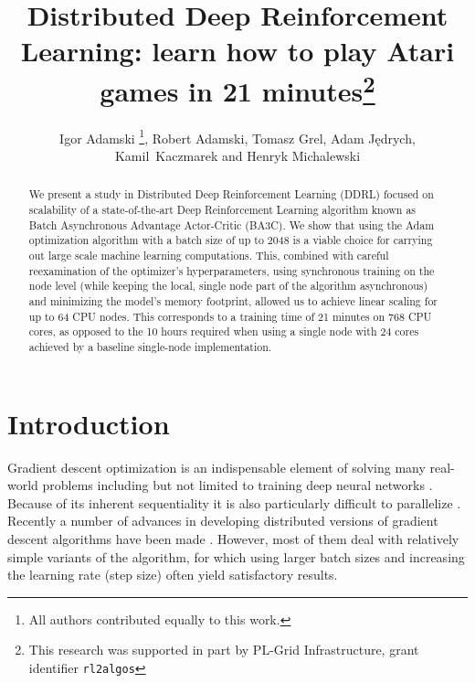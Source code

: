 \documentclass{llncs}
\begin{document}
\frontmatter
\pagestyle{headings}
\mainmatter  

	
\title{Distributed Deep Reinforcement Learning: learn how to play Atari games in 21 minutes\thanks{This research was supported in part by PL-Grid Infrastructure, grant identifier \texttt{rl2algos}}}
\author{Igor Adamski \thanks{All authors contributed equally to this work.}, Robert Adamski, Tomasz Grel, Adam Jędrych, \mbox{Kamil Kaczmarek} and Henryk Michalewski}


\maketitle

\begin{abstract}
We present a study in Distributed Deep Reinforcement Learning (DDRL) focused on scalability of a state-of-the-art Deep Reinforcement Learning algorithm known as Batch Asynchronous Advantage Actor-Critic (BA3C). We show that using the Adam optimization algorithm with a batch size of up to 2048 is a viable choice for carrying out large scale machine learning computations. This, combined with careful reexamination of the optimizer's hyperparameters, using synchronous training on the node level (while keeping the local, single node part of the algorithm asynchronous) and minimizing the model's memory footprint, allowed us to achieve linear scaling for up to 64 CPU nodes. This corresponds to a training time of 21 minutes on 768 CPU cores, as opposed to the 10 hours required when using a single node with 24 cores achieved by a baseline single-node implementation.
\end{abstract}




\section{Introduction}

Gradient descent optimization is an indispensable element of solving many real-world problems including but not limited to training deep neural networks \cite{Goodfellow_deep_learning,optimization_reference}. Because of its inherent sequentiality it is also particularly difficult to parallelize \cite{MLHPC_scalability_limits}. Recently a number of advances in developing distributed versions of gradient descent algorithms have been made \cite{fair_paper,google_brain_paper,LARS,100_epoch_alexnet,TernGrad}. However, most of them deal with relatively simple variants of the algorithm, for which using larger batch sizes and increasing the learning rate (step size) often yield satisfactory results. 
\end{document}
